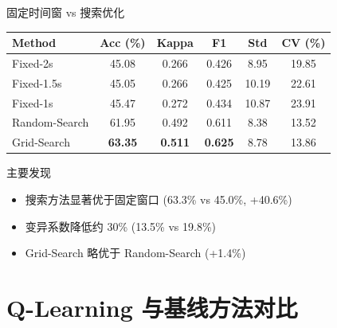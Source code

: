 \begin{frame}{固定时间窗 vs 搜索优化}
    \begin{table}[h]
        \centering
        \footnotesize
        \begin{tabular}{lccccc}
            \hline
            \textbf{Method} & \textbf{Acc (\%)} & \textbf{Kappa} & \textbf{F1} & \textbf{Std} & \textbf{CV (\%)} \\
            \hline
            Fixed-2s & 45.08 & 0.266 & 0.426 & 8.95 & 19.85 \\
            Fixed-1.5s & 45.05 & 0.266 & 0.425 & 10.19 & 22.61 \\
            Fixed-1s & 45.47 & 0.272 & 0.434 & 10.87 & 23.91 \\
            Random-Search & 61.95 & 0.492 & 0.611 & 8.38 & 13.52 \\
            Grid-Search & \textbf{63.35} & \textbf{0.511} & \textbf{0.625} & 8.78 & 13.86 \\
            \hline
        \end{tabular}
    \end{table}
    
    \vspace{0.3cm}
    \begin{alertblock}{主要发现}
        \begin{itemize}
            \item 搜索方法显著优于固定窗口 (63.3\% vs 45.0\%, +40.6\%)
            \item 变异系数降低约 30\% (13.5\% vs 19.8\%)
            \item Grid-Search 略优于 Random-Search (+1.4\%)
        \end{itemize}
    \end{alertblock}
\end{frame}

\section{Q-Learning 与基线方法对比}

